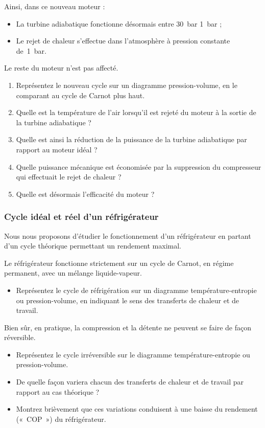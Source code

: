 	Ainsi, dans ce nouveau moteur :
		\begin{itemize}
			\item La turbine adiabatique fonctionne désormais entre \SI{30}{\bar} \SI{1}{\bar} ;
			\item Le rejet de chaleur s’effectue dans l’atmosphère à pression constante de~\SI{1}{\bar}.
		\end{itemize}
	Le reste du moteur n’est pas affecté.
	
	\begin{enumerate}
		\item Représentez le nouveau cycle sur un diagramme pression-volume, en le comparant au cycle de Carnot plus haut.
		\item Quelle est la température de l’air lorsqu’il est rejeté du moteur à la sortie de la turbine adiabatique ?
		\item Quelle est ainsi la réduction de la puissance de la turbine adiabatique par rapport au moteur idéal ?
		\item Quelle puissance mécanique est économisée par la suppression du compresseur qui effectuait le rejet de chaleur ?
		\item Quelle est désormais l’efficacité du moteur ?
	\end{enumerate}


\subsubsection{Cycle idéal et réel d’un réfrigérateur}

	\wherefrom{[DS n°2 2011, 4pts]}

	Nous nous proposons d’étudier le fonctionnement d’un réfrigérateur en partant d’un cycle théorique permettant un rendement maximal.
	
	Le réfrigérateur fonctionne strictement sur un cycle de Carnot, en régime permanent, avec un mélange liquide-vapeur.
	
	\begin{itemize}
		\item Représentez le cycle de réfrigération sur un diagramme température-entropie ou pression-volume, en indiquant le sens des transferts de chaleur et de travail.
	\end{itemize}
	
	Bien sûr, en pratique, la compression et la détente ne peuvent se faire de façon réversible.
	
	\begin{itemize}
		\item Représentez le cycle irréversible sur le diagramme température-entropie ou pression-volume.
		\item De quelle façon variera chacun des transferts de chaleur et de travail par rapport au cas théorique ?
		\item Montrez brièvement que ces variations conduisent à une baisse du rendement («~COP~») du réfrigérateur.
	\end{itemize}


